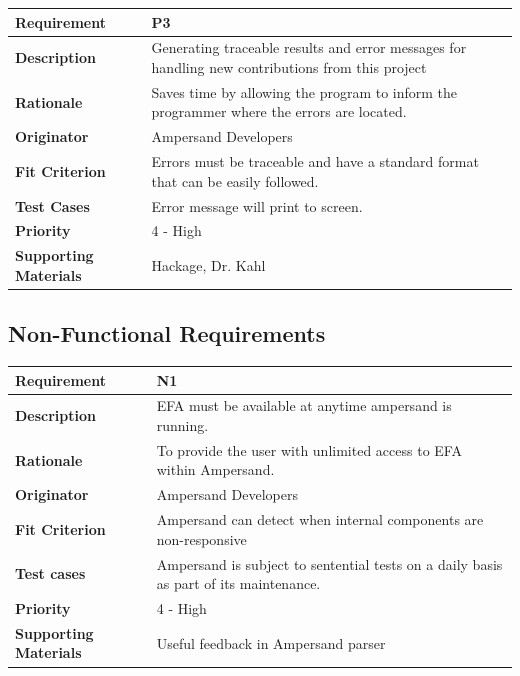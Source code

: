 \documentclass[12pt]{report}
\begin{document}
{\setlength{\tabcolsep}{6pt} %
    \begin{tabularx}{\textwidth}{>{\bfseries}C{3cm}X}
        Requirement & P3 \\ 
        \midrule
        \endhead
        Description  & Generating traceable results and error messages for 
        handling new contributions from this project
        \\	Rationale & Saves time by allowing the program to inform the 
        programmer where the errors are located.
        \\	Originator & Ampersand Developers
        \\	Fit Criterion & Errors must be traceable and have a standard format 
        that can be easily followed.
        \\ Test Cases & Error message will print to screen.
        \\	Priority & 4 - High
        \\	Supporting Materials & Hackage, Dr. Kahl
        \vspace{12pt}
    \end{tabularx}
}

\subsection{Non-Functional Requirements}
{\setlength{\tabcolsep}{6pt} %
\begin{tabularx}{\textwidth}{>{\bfseries}C{3cm}X}
Requirement & N1 \\ 
\midrule
\endhead
Description  & EFA must be available at anytime ampersand is running.
\\	Rationale & To provide the user with unlimited access to EFA within 
Ampersand.
\\	Originator & Ampersand Developers
\\	Fit Criterion & Ampersand can detect when internal components are 
non-responsive
\\ Test cases & Ampersand is subject to sentential tests on a daily basis as 
part of its maintenance.   
\\	Priority & 4 - High
\\	Supporting Materials & Useful feedback in Ampersand parser \cite{SB2011}
\vspace{12pt}
\end{tabularx}
}
\end{document}
